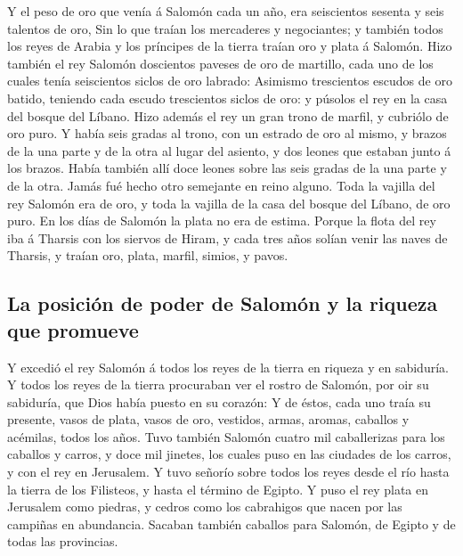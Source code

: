  Y el peso de oro que venía á Salomón cada un año, era
seiscientos sesenta y seis talentos de oro,  Sin lo que
traían los mercaderes y negociantes; y también todos los reyes de Arabia
y los príncipes de la tierra traían oro y plata á Salomón. 
Hizo también el rey Salomón doscientos paveses de oro de martillo, cada
uno de los cuales tenía seiscientos siclos de oro labrado: 
Asimismo trescientos escudos de oro batido, teniendo cada escudo
trescientos siclos de oro: y púsolos el rey en la casa del bosque del
Líbano.  Hizo además el rey un gran trono de marfil, y
cubriólo de oro puro.  Y había seis gradas al trono, con un
estrado de oro al mismo, y brazos de la una parte y de la otra al lugar
del asiento, y dos leones que estaban junto á los brazos. 
Había también allí doce leones sobre las seis gradas de la una parte y
de la otra. Jamás fué hecho otro semejante en reino alguno.
 Toda la vajilla del rey Salomón era de oro, y toda la
vajilla de la casa del bosque del Líbano, de oro puro. En los días de
Salomón la plata no era de estima.  Porque la flota del rey
iba á Tharsis con los siervos de Hiram, y cada tres años solían venir
las naves de Tharsis, y traían oro, plata, marfil, simios, y pavos.

\hypertarget{la-posiciuxf3n-de-poder-de-salomuxf3n-y-la-riqueza-que-promueve}{%
\subsection{La posición de poder de Salomón y la riqueza que
promueve}\label{la-posiciuxf3n-de-poder-de-salomuxf3n-y-la-riqueza-que-promueve}}

 Y excedió el rey Salomón á todos los reyes de la tierra en
riqueza y en sabiduría.  Y todos los reyes de la tierra
procuraban ver el rostro de Salomón, por oir su sabiduría, que Dios
había puesto en su corazón:  Y de éstos, cada uno traía su
presente, vasos de plata, vasos de oro, vestidos, armas, aromas,
caballos y acémilas, todos los años.  Tuvo también Salomón
cuatro mil caballerizas para los caballos y carros, y doce mil jinetes,
los cuales puso en las ciudades de los carros, y con el rey en
Jerusalem.  Y tuvo señorío sobre todos los reyes desde el
río hasta la tierra de los Filisteos, y hasta el término de Egipto.
 Y puso el rey plata en Jerusalem como piedras, y cedros
como los cabrahigos que nacen por las campiñas en abundancia.
 Sacaban también caballos para Salomón, de Egipto y de
todas las provincias.

